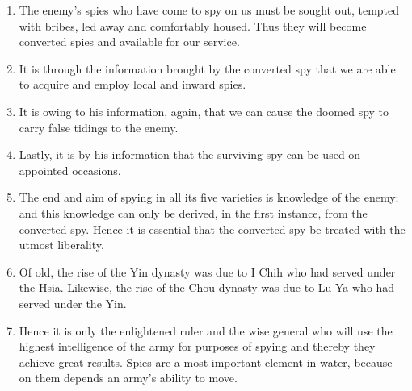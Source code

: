 \begin{enumerate}
  \item The enemy's spies who have come to spy on us must be sought
    out, tempted with bribes, led away and comfortably housed. Thus
    they will become converted spies and available for our service.

  \item It is through the information brought by the converted spy
    that we are able to acquire and employ local and inward spies.

  \item It is owing to his information, again, that we can cause the
    doomed spy to carry false tidings to the enemy.

  \item Lastly, it is by his information that the surviving spy can be
    used on appointed occasions.

  \item The end and aim of spying in all its five varieties is
    knowledge of the enemy; and this knowledge can only be derived, in
    the first instance, from the converted spy. Hence it is essential
    that the converted spy be treated with the utmost liberality.

  \item Of old, the rise of the Yin dynasty was due to I Chih who had
    served under the Hsia. Likewise, the rise of the Chou dynasty was
    due to Lu Ya who had served under the Yin.

  \item Hence it is only the enlightened ruler and the wise general
    who will use the highest intelligence of the army for purposes of
    spying and thereby they achieve great results. Spies are a most
    important element in water, because on them depends an army's
    ability to move.

  \end{enumerate}

